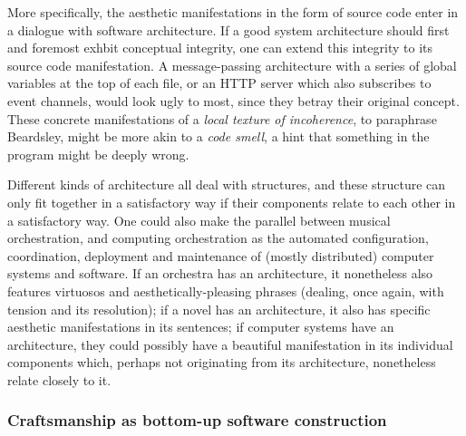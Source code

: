 \documentclass{article}
\begin{document}
More specifically, the aesthetic manifestations in the form of source code enter in a dialogue with software architecture. If a good system architecture should first and foremost exhbit conceptual integrity\cite{spinellis_beautiful_2009}, one can extend this integrity to its source code manifestation. A message-passing architecture with a series of global variables at the top of each file, or an HTTP server which also subscribes to event channels, would look ugly to most, since they betray their original concept. These concrete manifestations of a \emph{local texture of incoherence}, to paraphrase Beardsley, might be more akin to a \emph{code smell}, a hint that something in the program might be deeply wrong.

Different kinds of architecture all deal with structures, and these structure can only fit together in a satisfactory way if their components relate to each other in a satisfactory way. One could also make the parallel between musical orchestration, and computing orchestration as the automated configuration, coordination, deployment and maintenance of (mostly distributed) computer systems and software. If an orchestra has an architecture, it nonetheless also features virtuosos and aesthetically-pleasing phrases (dealing, once again, with tension and its resolution); if a novel has an architecture, it also has specific aesthetic manifestations in its sentences; if computer systems have an architecture, they could possibly have a beautiful manifestation in its individual components which, perhaps not originating from its architecture, nonetheless relate closely to it.

\subsubsection{Craftsmanship as bottom-up software construction}
\end{document}
